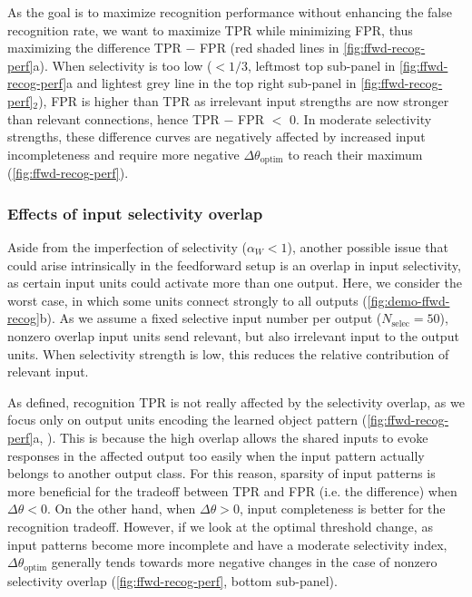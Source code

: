 As the goal is to maximize recognition performance without enhancing the false recognition rate,
        we want to maximize TPR while minimizing FPR,
        thus maximizing the difference TPR $-$ FPR
        (red shaded lines in \autoref{fig:ffwd-recog-perf}a).
    When selectivity is too low
        ($ < 1/3$, leftmost top sub-panel in \autoref{fig:ffwd-recog-perf}a
        and lightest grey line in the top right sub-panel in
        \autoref{fig:ffwd-recog-perf}$_2$),
        FPR is higher than TPR as irrelevant input strengths are now stronger than relevant connections,
        hence TPR $-$ FPR $<$ 0.
    In moderate selectivity strengths, these difference curves are negatively affected by increased input incompleteness
        and require more negative $\Delta \theta_{\mathrm{optim}}$ to reach their maximum
        (\autoref{fig:ffwd-recog-perf}).

\subsubsection*{Effects of input selectivity overlap}

Aside from the imperfection of selectivity ($\alpha_W < 1$),
        another possible issue that could arise intrinsically in the feedforward setup is
        an overlap in input selectivity, as certain input units could activate more than one output.
    Here, we consider the worst case, in which some units connect strongly to all outputs (\autoref{fig:demo-ffwd-recog}b).
    As we assume a fixed selective input number per output ($N_{\text{selec}} = 50$),
        nonzero overlap input units send relevant,
        but also irrelevant input to the output units.
    When selectivity strength is low, this reduces the relative contribution of relevant input.

As defined, recognition TPR is not really affected by the selectivity overlap,
        as we focus only on output units encoding the learned object pattern
        (\autoref{fig:ffwd-recog-perf}a,
        ).
    This is because the high overlap allows the shared inputs
        to evoke responses in the affected output too easily
        when the input pattern actually belongs to another output class.
    For this reason, sparsity of input patterns is more beneficial
        for the tradeoff between TPR and FPR (i.e. the difference) when $\Delta \theta < 0$.
    On the other hand, when $\Delta \theta > 0$, input completeness is better for the recognition tradeoff.
    However, if we look at the optimal threshold change,
        as input patterns become more incomplete and have a moderate selectivity index,
        $\Delta \theta_{\mathrm{optim}}$ generally tends towards more negative changes
        in the case of nonzero selectivity overlap
        (\autoref{fig:ffwd-recog-perf}, bottom sub-panel).

